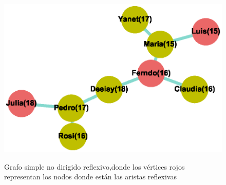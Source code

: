 \documentclass{article}
\begin{document}
  
  
\begin{center}

\end{center}
\begin{figure}[h]
\begin{center}
\includegraphics[scale=0.7]{Graf3_kamada_kawai_layout.eps}\\
\caption{Grafo simple no dirigido reflexivo,donde los vértices rojos representan los nodos donde están las aristas reflexivas}
\end{center}
\end{figure}
\newpage
\end{document}
